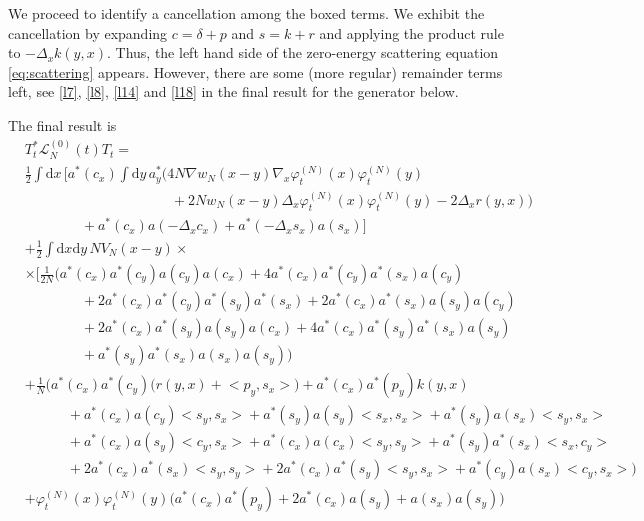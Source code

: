 \documentclass[11pt,a4paper,draft,DIV11]{scrartcl}	%
\newcommand{\di}{\textrm{d}}		%
\newcommand{\Lcal}{\mathcal{L}}		%
\newcommand{\scal}[2]{\big<#1,#2\big>} %
\newcommand{\ph}{\varphi_t^{(N)}}	%
\newcommand{\eqr}[1]{\eqref{eq:#1}}			%
\begin{document}
We proceed to identify a cancellation among the boxed terms. We exhibit the
cancellation by expanding $c = \delta + p$ and $s = k + r$ and applying the
product rule to $-\Delta_x k(y,x)$. Thus, the left hand side of the zero-energy scattering equation \eqr{scattering} appears. However, there are some (more regular) remainder terms left, see \eqref{l7}, \eqref{l8}, \eqref{l14} and \eqref{l18} in the final result for the generator below.

The final result is
\begin{align}
& T^*_t \Lcal_N^{(0)}(t) T_t = \nonumber \\ 
& \frac{1}{2} \int \di x\, \bigg[ a^*(c_x) \int \di y\, a^*_y \Big(4 N \nabla w_N(x-y) \nabla_x \ph(x) \ph(y) \label{l7}\\
& \qquad\qquad \qquad\qquad \qquad \ \	+ 2Nw_N(x-y) \Delta_x \ph(x) \ph(y) - 2\Delta_x r(y,x) \Big) \label{l8}\\
& \qquad\qquad 			+ a^*(c_x) a(-\Delta_x c_x) + a^*(-\Delta_x s_x) a(s_x) \bigg] \label{l9} \\
& + \frac{1}{2}\int \di x \di y\, NV_N(x-y) \times \nonumber \\
& \times \Big[   \frac{1}{2N}\bigg( a^*(c_x) a^*(c_y) a(c_y) a(c_x) + 4 a^*(c_x) a^*(c_y) a^*(s_x) a(c_y) \label{l10}\\
				      & \qquad\qquad + 2 a^*(c_x) a^*(c_y) a^*(s_y) a^*(s_x) + 2 a^*(c_x) a^*(s_x) a(s_y) a(c_y) \label{l11}\\
				      & \qquad\qquad + 2 a^*(c_x) a^*(s_y) a(s_y) a(c_x) + 4 a^*(c_x) a^*(s_y) a^*(s_x) a(s_y) \label{l12}\\
				      & \qquad\qquad + a^*(s_y) a^*(s_x) a(s_x) a(s_y) \bigg) \label{l13}\\
& + \frac{1}{N}\bigg(   a^*(c_x) a^*(c_y) \Big( r(y,x) + \scal{p_y}{s_x} \Big) + a^*(c_x) a^*(p_y) k(y,x) \label{l14} \\
      & \qquad\quad + a^*(c_x) a(c_y) \scal{s_y}{s_x} + a^*(s_y) a(s_y) \scal{s_x}{s_x} + a^*(s_y) a(s_x) \scal{s_y}{s_x} \label{l15}\\
      & \qquad\quad + a^*(c_x) a(s_y) \scal{c_y}{s_x} + a^*(c_x) a(c_x) \scal{s_y}{s_y} + a^*(s_y) a^*(s_x) \scal{s_x}{c_y} \label{l16}\\
      & \qquad\quad + 2a^*(c_x) a^*(s_x) \scal{s_y}{s_y} + 2a^*(c_x)a^*(s_y) \scal{s_y}{s_x} + a^*(c_y) a(s_x) \scal{c_y}{s_x}    \bigg) \label{l17}\\
& + \ph(x)\ph(y) \Big( a^*(c_x) a^*(p_y) + 2 a^*(c_x) a(s_y) +a(s_x) a(s_y) \Big) \label{l18}\\

\end{align}
\end{document}
